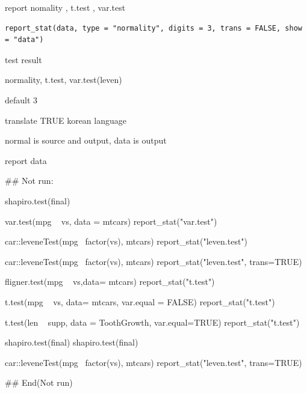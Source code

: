 \documentclass[a4paper]{book}
\begin{document}
%
\begin{Description}
report nomality , t.test , var.test
\end{Description}
%
\begin{Usage}
\begin{verbatim}
report_stat(data, type = "normality", digits = 3, trans = FALSE, show = "data")
\end{verbatim}
\end{Usage}
%
\begin{Arguments}
\begin{ldescription}
\item[\code{data}] test result

\item[\code{type}] normality, t.test, var.test(leven)

\item[\code{digits}] default 3

\item[\code{trans}] translate TRUE korean language

\item[\code{show}] normal is source and output, data is output
\end{ldescription}
\end{Arguments}
%
\begin{Value}
report data
\end{Value}
%
\begin{Examples}
\begin{ExampleCode}
\#\# Not run: 

shapiro.test(final) %

var.test(mpg ~ vs, data = mtcars)%
report_stat("var.test")

car::leveneTest(mpg~ factor(vs), mtcars)%
 report_stat("leven.test")

car::leveneTest(mpg~ factor(vs), mtcars)%
report_stat("leven.test", trans=TRUE)


fligner.test(mpg ~ vs,data= mtcars) %
report_stat("t.test")

t.test(mpg ~ vs, data= mtcars, var.equal = FALSE)%
report_stat("t.test")

t.test(len ~ supp, data = ToothGrowth, var.equal=TRUE) %
report_stat("t.test")

shapiro.test(final) %
shapiro.test(final) %

car::leveneTest(mpg~ factor(vs), mtcars)%
report_stat("leven.test", trans=TRUE)



## End(Not run)

\end{ExampleCode}
\end{Examples}
\end{document}
